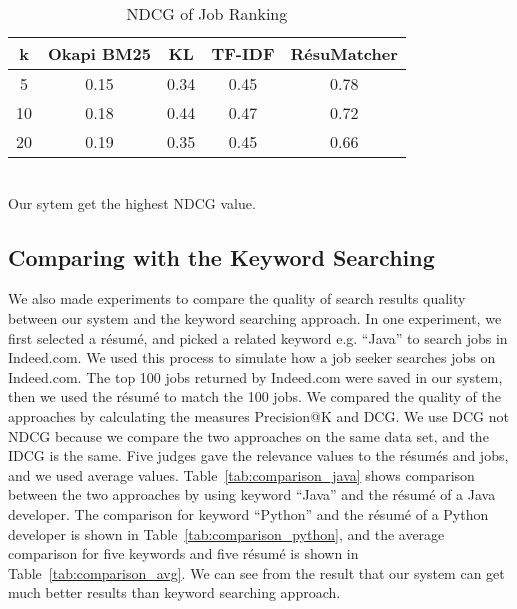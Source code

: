 \begin{table}[ht]
\caption{NDCG of Job Ranking } %
\centering %
\begin{tabular}{    | c | c | c | c | c |  }
 \hline
       k    & Okapi BM25 & KL    & TF-IDF & R\'esuMatcher  \\
 \hline
       5    & 0.15       & 0.34  & 0.45     & 0.78   \\
 \hline
       10   & 0.18       & 0.44  & 0.47     & 0.72   \\
 \hline
       20   & 0.19       & 0.35  & 0.45     & 0.66   \\
 \hline

\end{tabular}
\label{tab:job_ndcg} %
\\Our sytem get the highest NDCG value.
\end{table}

\subsection{Comparing with the Keyword Searching}
We also made experiments to compare the quality of search results quality between our system and the keyword searching approach. In one experiment, we first selected a r\'esum\'e, and picked a related keyword e.g. ``Java''  to search jobs in Indeed.com. We used this process to simulate how a job seeker searches jobs on Indeed.com. The top 100 jobs returned by Indeed.com were saved in our system, then we used the r\'esum\'e to match the 100 jobs. We compared the quality of the approaches by calculating the measures Precision@K  and  DCG. We use DCG not NDCG because we compare the two approaches on the same data set, and the IDCG is the same. Five judges gave the relevance values to the r\'esum\'es and jobs, and we used average values. Table~\ref{tab:comparison_java} shows comparison between the two approaches by using keyword ``Java'' and the r\'esum\'e of a Java developer. The comparison for  keyword ``Python'' and the r\'esum\'e of a Python developer is shown in Table~\ref{tab:comparison_python}, and the average comparison for five keywords and five r\'esum\'e is shown in Table~\ref{tab:comparison_avg}. We can see from the result that our system can get much better results than keyword searching approach.

